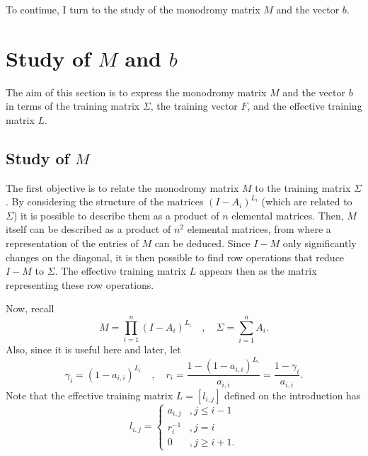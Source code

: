 \documentclass[]{interact}
\theoremstyle{plain}%
\theoremstyle{definition}
\theoremstyle{remark}
\begin{document}
To continue, I turn to the study of the monodromy matrix $M$ and the vector $b$.

\section{Study of $M$ and $b$}\label{training}

The aim of this section is to express the monodromy matrix $M$ and the vector $b$ in terms of the training matrix $\Sigma$, the training vector $F$, and the effective training matrix $L$.

\subsection{Study of $M$}
The first objective is to relate the monodromy matrix $M$ to the training matrix $\Sigma$. By considering the structure of the matrices $(I-A_i)^{L_i}$ (which are related to $\Sigma$) it is possible to describe them as a product of $n$ elemental matrices. Then, $M$ itself can be described as a product of $n^2$ elemental matrices, from where a representation of the entries of $M$ can be deduced. Since $I-M$ only significantly changes on the diagonal, it is then possible to find row operations that reduce $I-M$ to $\Sigma$. The effective training matrix $L$ appears then as the matrix representing these row operations. 

Now, recall
\[
M=\prod_{i=1}^n(I-A_i)^{L_i} \quad , \quad \Sigma=\sum_{i=1}^n A_i.
\]
Also, since it is useful here and later, let
\[
\gamma_i=(1-a_{i,i})^{L_i} \quad , \quad r_i=\frac{1-(1-a_{i,i})^{L_i}}{a_{i,i}}=\frac{1-\gamma_i}{a_{i,i}}.
\]
Note that the effective training matrix $L=[l_{i,j}]$ defined on the introduction has
\[
l_{i,j}=\begin{cases}
a_{i,j}& , j\leq i-1\\
r_i^{-1}& , j=i\\
0&, j\geq i+1.
\end{cases}
\]
\end{document}

